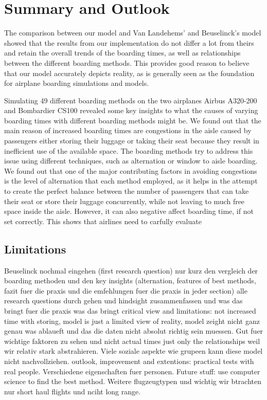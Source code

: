 \documentclass[11pt]{article}
\begin{document}
	

\section{Summary and Outlook}
The comparison between our model and Van Landehems' and Beuselinck's model \cite{beus} showed that the results from our implementation do not differ a lot from theirs and retain the overall trends of the boarding times, as well as relationships between the different boarding methods. This provides good reason to believe that our model accurately depicts reality, as \cite{beus} is generally seen as the foundation for airplane boarding simulations and models. 

Simulating 49 different boarding methods on the two airplanes Airbus A320-200 and Bombardier CS100 revealed some key insights to what the causes of varying boarding times with different boarding methods might be. We found out that the main reason of increased boarding times are congestions in the aisle caused by passengers either storing their luggage or taking their seat because they result in inefficient use of the available space. The boarding methods try to address this issue using different techniques, such as alternation or window to aisle boarding. We found out that one of the major contributing factors in avoiding congestions is the level of alternation that each method employed, as it helps in the attempt to create the perfect balance between the number of passengers that can take their seat or store their luggage concurrently, while not leaving to much free space inside the aisle. However, it can also negative affect boarding time, if not set correctly. This shows that airlines need to carfully evaluate

\subsection{Limitations}

Beuselinck nochmal eingehen (first research question) nur kurz 
den vergleich der boarding methoden und den key insights (alternation, features of best methods, fazit fuer die praxis und die emfehlungen fuer die praxis in jeder section)
alle research questions durch gehen und hindsight zusammenfassen und was das bringt fuer die praxis was das bringt
critical view and limitations: not increased time with storing, model is just a limited view of reality, model zeight nicht ganz genau was ablaueft und das die daten nicht absolut richtig sein muessen. Gut fuer wichtige faktoren zu sehen und nicht actual times just only the relationships weil wir relativ stark abstrahieren. Viele soziale aspekte wie grupeen kann diese model nicht nachvollziehen. 
outlook, improvement and extentions: practical tests with real people. Verschiedene eigenschaften fuer personen. 
Future stuff: use computer science to find the best method. Weitere flugzeugtypen und wichtig wir btrachten nur short haul flights und nciht long range. 
\end{document}
